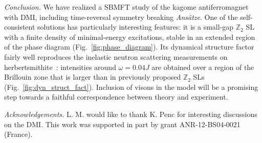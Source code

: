 \documentclass[aps,prl,twocolumn,superscriptaddress,showpacs,a4paper, longbibliography]{revtex4-1}
\begin{document}
{\it Conclusion.} We have realized a SBMFT study of the kagome antiferromagnet with DMI, including time-reversal symmetry breaking \textit{Ans\"atze}.
One of the self-consistent solutions has particularly interesting features: it is a small-gap $\mathbb Z_2$ SL with a finite density of minimal-energy excitations, stable in an extended region of the phase diagram (Fig.~\ref{fig:phase_diagram}).
Its dynamical structure factor fairly well reproduces the inelastic neutron scattering measurements on herbertsmithite~\cite{Nature_DM}: intensities around $\omega = 0.04J$ are obtained over a region of the Brillouin zone that is larger than in previously proposed $\mathbb Z_2$ SLs (Fig.~\ref{fig:dyn_struct_fact}).
Inclusion of visons \cite{SBMFT_Nature} in the model will be a promising step towards a faithful correspondence between theory and experiment.

{\it Acknowledgements.} L. M. would like to thank K. Penc for interesting discussions on the DMI.
This work was supported in part by grant ANR-12-BS04-0021 (France).



\end{document}
